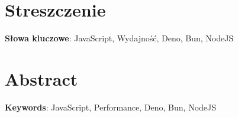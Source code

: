 \section*{Streszczenie}

\bigskip

\textbf{Słowa kluczowe}: JavaScript, Wydajność, Deno, Bun, NodeJS

\newpage

\section*{Abstract}

\bigskip

\textbf{Keywords}: JavaScript, Performance, Deno, Bun, NodeJS
